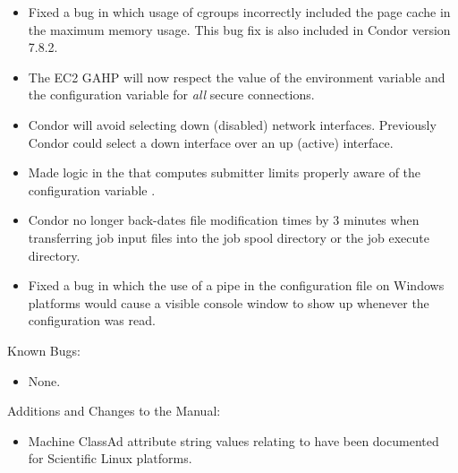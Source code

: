 \begin{itemize}

\item Fixed a bug in which usage of cgroups incorrectly included the page cache 
in the maximum memory usage.
This bug fix is also included in Condor version 7.8.2.

\item The EC2 GAHP will now respect the value of the environment variable
 and the configuration variable
 for \emph{all} secure connections.

\item Condor will avoid selecting down (disabled) network interfaces.  Previously Condor could select a down interface over an up (active) interface.

\item Made logic in the  that computes submitter limits 
properly aware of the configuration variable
.


\item Condor no longer back-dates file modification times by 3 minutes
when transferring job input files into the job spool directory or the job
execute directory.

\item Fixed a bug in which the use of a pipe in the configuration file 
on Windows platforms would cause a visible console window 
to show up whenever the configuration was read.

\end{itemize}

\noindent Known Bugs:

\begin{itemize}

\item None.

\end{itemize}

\noindent Additions and Changes to the Manual:

\begin{itemize}

\item Machine ClassAd attribute string values relating to  have
been documented for Scientific Linux platforms.

\end{itemize}

